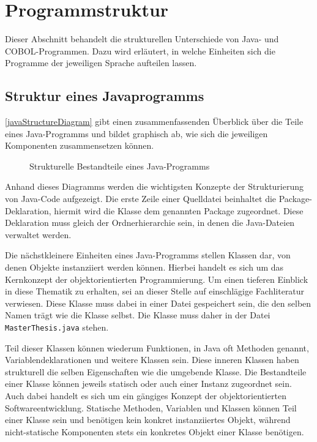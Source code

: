 \section{Programmstruktur}\label{sec:structure}
Dieser Abschnitt behandelt die strukturellen Unterschiede von Java- und COBOL-Programmen. Dazu wird erläutert, in welche Einheiten sich die Programme der jeweiligen Sprache aufteilen lassen. 

\subsection*{Struktur eines Javaprogramms}
\autoref{javaStructureDiagram} gibt einen zusammenfassenden Überblick über die Teile eines Java-Programms und bildet graphisch ab, wie sich die jeweiligen Komponenten zusammensetzen können.

\begin{figure}[H]
    \centering
    \resizebox{.9\linewidth}{!}{\unskip}
    \caption{Strukturelle Bestandteile eines Java-Programms \label{javaStructureDiagram}}
\end{figure}

Anhand dieses Diagramms werden die wichtigsten Konzepte der Strukturierung von Java-Code aufgezeigt. Die erste Zeile einer Quelldatei beinhaltet die Package-Deklaration, \dahe hiermit wird die Klasse dem genannten Package zugeordnet. Diese Deklaration muss gleich der Ordnerhierarchie sein, in denen die Java-Dateien verwaltet werden. 

Die nächstkleinere Einheiten eines Java-Programms stellen Klassen dar, von denen Objekte instanziiert werden können. Hierbei handelt es sich um das Kernkonzept der objektorientierten Programmierung. Um einen tieferen Einblick in diese Thematik zu erhalten, sei an dieser Stelle auf einschlägige Fachliteratur verwiesen. Diese Klasse muss dabei in einer Datei gespeichert sein, die den selben Namen trägt wie die Klasse selbst. Die Klasse  muss daher in der Datei \texttt{MasterThesis.java} stehen.

Teil dieser Klassen können wiederum Funktionen, in Java oft Methoden genannt, Variablendeklarationen und weitere Klassen sein. Diese inneren Klassen haben strukturell die selben Eigenschaften wie die umgebende Klasse. Die Bestandteile einer Klasse können jeweils statisch oder auch einer Instanz zugeordnet sein. Auch dabei handelt es sich um ein gängiges Konzept der objektorientierten Softwareentwicklung. Statische Methoden, Variablen und Klassen können Teil einer Klasse sein und benötigen kein konkret instanziiertes Objekt, während nicht-statische Komponenten stets ein konkretes Objekt einer Klasse benötigen. 

